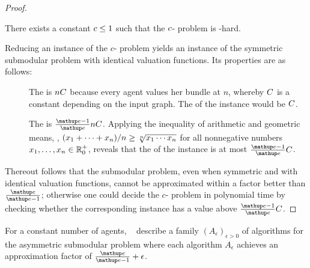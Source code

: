 \begin{proof}
	\begin{proposition}
		There exists a constant \(c \le 1\) such that the \(c\)-\Gap{} problem is \NP-hard.
	\end{proposition}
	Reducing an instance of the \(c\)-\Gap{} problem yields an instance of the symmetric submodular \USW{} problem with identical valuation functions.
	Its properties are as follows:
	\begin{description}
		\item[\Yes]
		The \USW{} is \(n C\) because every agent values her bundle at \(n\), whereby \(C\) is a constant depending on the input graph.
		The \NSW{} of the instance would be \(C\).

		\item[\No]
		The \USW{} is \(\frac{\euler - 1}{\euler} n \USWconstant\).
		Applying the inequality of arithmetic and geometric means, \ie{}, \((x_1 + \dots + x_n)/n \ge \smash{\sqrt[n]{x_1 \dotsm x_n}}\) for all nonnegative numbers \(x_1, \dots, x_n \in \realposzero\), reveals that the \NSW{} of the instance is at most \(\frac{\euler - 1}{\euler} \USWconstant\).
	\end{description}
	Thereout follows that the submodular \NSW{} problem, even when symmetric and with identical valuation functions, cannot be approximated within a factor better than \(\frac{\euler}{\euler - 1}\);
	otherwise one could decide the \(c\)-\Gap{} problem in polynomial time by checking whether the corresponding \NSW{} instance has a value above \(\frac{\euler - 1}{\euler} \USWconstant\).
\end{proof}

For a constant number of agents, \citeauthor{APNSWuSVþUM}~\cite[Section 5.1]{APNSWuSVþUM} describe a family \((A_{\epsilon})_{\epsilon > 0}\) of algorithms for the asymmetric submodular \NSW{} problem where each algorithm \(A_\epsilon\) achieves an approximation factor of \(\frac{\euler}{\euler - 1} + \epsilon\).

